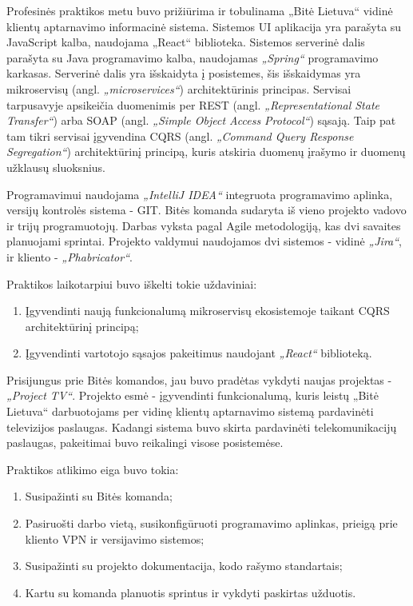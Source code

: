 \smallskip

Profesinės praktikos metu buvo prižiūrima ir tobulinama „Bitė Lietuva“ vidinė klientų aptarnavimo informacinė sistema. Sistemos UI aplikacija yra parašyta su JavaScript kalba,
naudojama „React“ biblioteka. Sistemos serverinė dalis parašyta su Java programavimo kalba, naudojamas \textit{„Spring“} programavimo karkasas. Serverinė dalis yra išskaidyta į
posistemes, šis išskaidymas yra mikroservisų (angl. \textit{„microservices“}) architektūrinis principas. Servisai tarpusavyje apsikeičia duomenimis per
REST (angl. \textit{„Representational State Transfer“}) arba SOAP (angl. \textit{„Simple Object Access Protocol“}) sąsają. Taip pat tam tikri servisai įgyvendina
CQRS (angl. \textit{„Command Query Response Segregation“}) architektūrinį principą, kuris atskiria duomenų įrašymo ir duomenų užklausų sluoksnius.

Programavimui naudojama \textit{„IntelliJ IDEA“} integruota programavimo aplinka, versijų kontrolės sistema - GIT. Bitės komanda sudaryta iš vieno projekto vadovo ir trijų programuotojų.
Darbas vyksta pagal Agile metodologiją, kas dvi savaites planuojami sprintai. Projekto valdymui naudojamos dvi sistemos - vidinė \textit{„Jira“}, ir kliento - \textit{„Phabricator“}.

\smallskip
Praktikos laikotarpiui buvo iškelti tokie uždaviniai:
\begin{enumerate}
    \item Įgyvendinti naują funkcionalumą mikroservisų ekosistemoje taikant CQRS architektūrinį principą;
    \item Įgyvendinti vartotojo sąsajos pakeitimus naudojant \textit{„React“} biblioteką.
\end{enumerate}

\smallskip
Prisijungus prie Bitės komandos, jau buvo pradėtas vykdyti naujas projektas - \textit{„Project TV“}. Projekto esmė - įgyvendinti funkcionalumą, kuris leistų „Bitė Lietuva“ darbuotojams
per vidinę klientų aptarnavimo sistemą pardavinėti televizijos paslaugas. Kadangi sistema buvo skirta pardavinėti telekomunikacijų paslaugas,
pakeitimai buvo reikalingi visose posistemėse.

\smallskip
Praktikos atlikimo eiga buvo tokia:
\begin{enumerate}
    \item Susipažinti su Bitės komanda;
    \item Pasiruošti darbo vietą, susikonfigūruoti programavimo aplinkas, prieigą prie kliento VPN ir versijavimo sistemos;
    \item Susipažinti su projekto dokumentacija, kodo rašymo standartais;
    \item Kartu su komanda planuotis sprintus ir vykdyti paskirtas užduotis.
\end{enumerate}

